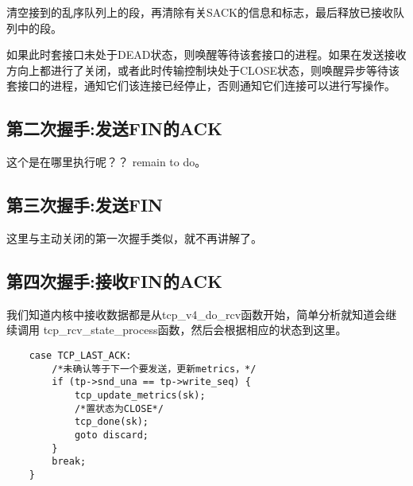             清空接到的乱序队列上的段，再清除有关SACK的信息和标志，最后释放已接收队列中的段。

            如果此时套接口未处于DEAD状态，则唤醒等待该套接口的进程。如果在发送接收方向上都进行了关闭，或者此时传输控制块处于CLOSE状态，则唤醒异步等待该套接口的进程，通知它们该连接已经停止，否则通知它们连接可以进行写操作。
    \subsection{第二次握手:发送FIN的ACK}
		这个是在哪里执行呢？？ remain to do。

    \subsection{第三次握手:发送FIN}
		这里与主动关闭的第一次握手类似，就不再讲解了。
    \subsection{第四次握手:接收FIN的ACK}

		我们知道内核中接收数据都是从tcp\_v4\_do\_rcv函数开始，简单分析就知道会继续调用
		tcp\_rcv\_state\_process函数，然后会根据相应的状态到这里。
\begin{verbatim}
	case TCP_LAST_ACK:
		/*未确认等于下一个要发送，更新metrics，*/
		if (tp->snd_una == tp->write_seq) {
			tcp_update_metrics(sk);
			/*置状态为CLOSE*/
			tcp_done(sk);
			goto discard;
		}
		break;
	}
\end{verbatim}


